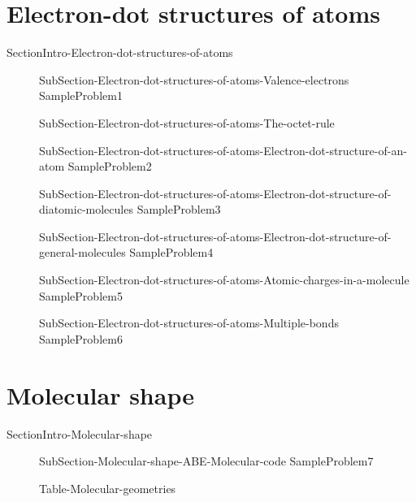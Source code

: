\documentclass[main.tex]{subfiles}
\begin{document}
\section{Electron-dot structures of atoms}{SectionIntro-Electron-dot-structures-of-atoms}
\sloppy\begin{description}
\item[] {SubSection-Electron-dot-structures-of-atoms-Valence-electrons}
{SampleProblem1}
\item[] {SubSection-Electron-dot-structures-of-atoms-The-octet-rule}
\item[] {SubSection-Electron-dot-structures-of-atoms-Electron-dot-structure-of-an-atom}
{SampleProblem2}
\item[] {SubSection-Electron-dot-structures-of-atoms-Electron-dot-structure-of-diatomic-molecules}
{SampleProblem3}
\item[] {SubSection-Electron-dot-structures-of-atoms-Electron-dot-structure-of-general-molecules}
{SampleProblem4}
\item[] {SubSection-Electron-dot-structures-of-atoms-Atomic-charges-in-a-molecule}
{SampleProblem5}
\item[] {SubSection-Electron-dot-structures-of-atoms-Multiple-bonds} 
{SampleProblem6}
\end{description}
\section{Molecular shape}{SectionIntro-Molecular-shape}
\sloppy\begin{description}
\item[] {SubSection-Molecular-shape-ABE-Molecular-code}
{SampleProblem7}

{Table-Molecular-geometries}
\end{description}
\end{document}
